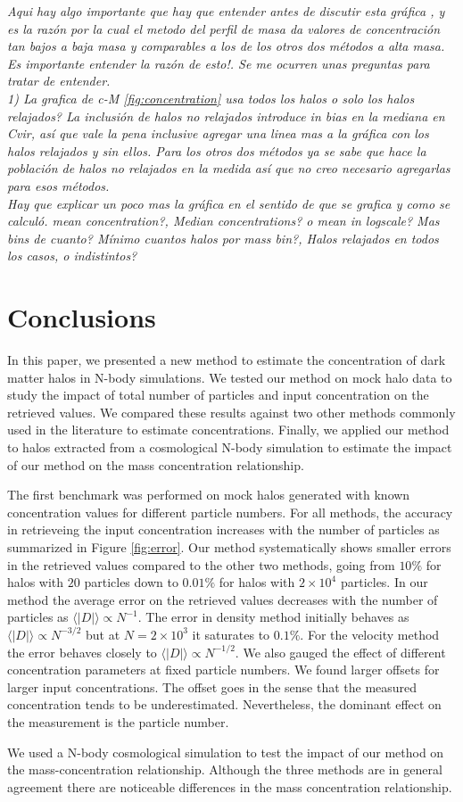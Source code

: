 \documentclass[a4,useAMS,usenatbib,usegraphicx]{mn2e}
\begin{document}
{\em Aqui hay algo importante que hay que entender antes de discutir
  esta gráfica , y es la razón por la cual el metodo del perfil de
  masa da valores de concentración tan bajos a baja masa y comparables
  a los de los otros dos métodos a alta masa. Es importante entender
  la razón de esto!.  Se me ocurren unas preguntas para tratar de
  entender. \\ 1) La grafica de c-M \ref{fig:concentration} usa todos
  los halos o solo los halos relajados? La inclusión de halos no
  relajados introduce in bias en la mediana en Cvir, así que vale la
  pena inclusive agregar una linea mas a la gráfica con los halos
  relajados y sin ellos. Para los otros dos métodos ya se sabe que
  hace la población de halos no relajados en la medida así que no creo
  necesario agregarlas para esos métodos. \\ Hay que explicar un poco
  mas la gráfica en el sentido de que se grafica y como se
  calculó. mean concentration?, Median concentrations? o mean in
  logscale?  Mas bins de cuanto? Mínimo cuantos halos por mass bin?,
  Halos relajados en todos los casos, o indistintos?}



\section{Conclusions}
\label{sec:conclusions}

In this paper, we presented a new method to estimate the concentration
of dark matter halos in N-body simulations.  We tested our method on
mock halo data to study the impact of total number of particles and
input concentration on the retrieved values.  We compared these
results against two other methods commonly used in the literature to
estimate concentrations.  Finally, we applied our method to halos
extracted from a cosmological N-body simulation to estimate the impact
of our method on the mass concentration relationship.


The first benchmark was performed on mock halos generated with known
concentration values for different particle numbers.  For all methods,
the accuracy in retrieveing the input concentration increases with the
number of particles as summarized in Figure \ref{fig:error}.  Our
method systematically shows smaller errors in the retrieved values
compared to the other two methods, going from $10\%$ for halos with
$20$ particles down to $0.01\%$ for halos with $2\times 10^4$
particles.  In our method the average error on the retrieved values
decreases with the number of particles as $\langle|D|\rangle\propto
N^{-1}$.  The error in density method initially behaves as
$\langle|D|\rangle\propto N^{-3/2}$ but at $N=2\times 10^3$ it
saturates to $0.1\%$.  For the velocity method the error behaves
closely to $\langle|D|\rangle\propto N^{-1/2}$.  We also gauged the
effect of different concentration parameters at fixed particle
numbers.  We found larger offsets for larger input concentrations.
The offset goes in the sense that the measured concentration tends to
be underestimated.  Nevertheless, the dominant effect on the
measurement is the particle number.

We used a N-body cosmological simulation to test the impact of our
method on the mass-concentration relationship.  Although the three
methods are in general agreement there are noticeable differences in
the mass concentration relationship.





\end{document}
